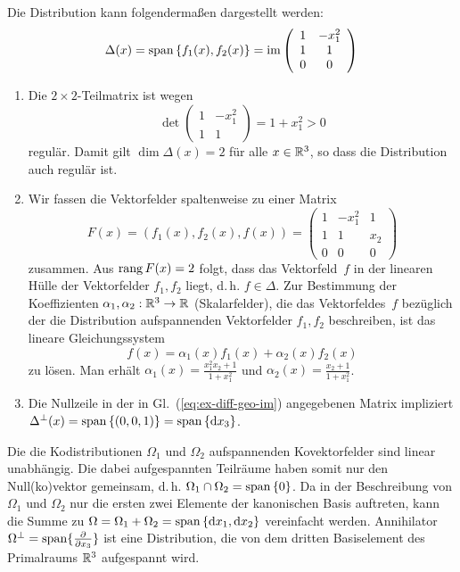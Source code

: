 \begin{loesung}Die Distribution kann folgendermaßen dargestellt werden:
\begin{equation}
\Delta(x)={\operatorname{span}}\left\{ f_{1}(x),f_{2}(x)\right\} ={\operatorname{im}}\left(\begin{array}{cc}
1 & -x_{1}^{2}\\
1 & 1\\
0 & 0
\end{array}\right)\label{eq:ex-diff-geo-im}
\end{equation}

\begin{enumerate}
\item Die $2\times2$-Teilmatrix ist wegen 
\[
\det\left(\begin{array}{cc}
1 & -x_{1}^{2}\\
1 & 1
\end{array}\right)=1+x_{1}^{2}>0
\]
regulär. Damit gilt $\dim\Delta(x)=2$ für alle $x\in{\mathbb{R}}^{3}$, so
dass die Distribution auch regulär ist.
\item Wir fassen die Vektorfelder spaltenweise zu einer Matrix 
\[
F(x)=\left(f_{1}(x),f_{2}(x),f(x)\right)=\left(\begin{array}{ccc}
1 & -x_{1}^{2} & 1\\
1 & 1 & x_{2}\\
0 & 0 & 0
\end{array}\right)
\]
zusammen. Aus ${\operatorname{rang}}\,F(x)=2$ folgt, dass das Vektorfeld~$f$ in
der linearen Hülle der Vektorfelder $f_{1},f_{2}$ liegt, d.\,h.
$f\in\Delta$. Zur Bestimmung der Koeffizienten $\alpha_{1},\alpha_{2}:{\mathbb{R}}^{3}\to{\mathbb{R}}$
(Skalarfelder), die das Vektorfeldes~$f$ bezüglich der die Distribution
aufspannenden Vektorfelder $f_{1},f_{2}$ beschreiben, ist das lineare
Gleichungssystem 
\[
f(x)=\alpha_{1}(x)f_{1}(x)+\alpha_{2}(x)f_{2}(x)
\]
zu lösen. Man erhält $\alpha_{1}(x)=\frac{x_{1}^{2}x_{2}+1}{1+x_{1}^{2}}$
und $\alpha_{2}(x)=\frac{x_{2}+1}{1+x_{1}^{2}}$.
\item Die Nullzeile in der in Gl.~(\ref{eq:ex-diff-geo-im}) angegebenen
Matrix impliziert $\Delta^{\perp}(x)={\operatorname{span}}\left\{ \left(0,0,1\right)\right\} ={\operatorname{span}}\left\{ \mathrm{d} x_{3}\right\} $.
\end{enumerate}
\end{loesung}

\begin{loesung}Die die Kodistributionen $\Omega_{1}$ und $\Omega_{2}$
aufspannenden Kovektorfelder sind linear unabhängig. Die dabei aufgespannten
Teilräume haben somit nur den Null(ko)vektor gemeinsam, d.\,h. $\Omega_{1}\cap\Omega_{2}={\operatorname{span}}\left\{ 0\right\} $.
Da in der Beschreibung von $\Omega_{1}$ und $\Omega_{2}$ nur die
ersten zwei Elemente der kanonischen Basis auftreten, kann die Summe
zu $\Omega=\Omega_{1}+\Omega_{2}={\operatorname{span}}\left\{ {\mathrm{d}} x_{1},{\mathrm{d}} x_{2}\right\} $
vereinfacht werden. Annihilator $\Omega^{\perp}={\operatorname{span}}\{\frac{\partial}{\partial x_{3}}\}$
ist eine Distribution, die von dem dritten Basiselement des Primal\-raums
${\mathbb{R}}^{3}$ aufgespannt wird.\end{loesung}


